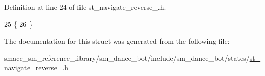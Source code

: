 Definition at line 24 of file st\+\_\+navigate\+\_\+reverse\+\_.\+h.


\begin{DoxyCode}
25    \{
26    \}
\end{DoxyCode}


The documentation for this struct was generated from the following file\+:\begin{DoxyCompactItemize}
\item 
smacc\+\_\+sm\+\_\+reference\+\_\+library/sm\+\_\+dance\+\_\+bot/include/sm\+\_\+dance\+\_\+bot/states/\hyperlink{st__navigate__reverse__2_8h}{st\+\_\+navigate\+\_\+reverse\+\_.\+h}\end{DoxyCompactItemize}

